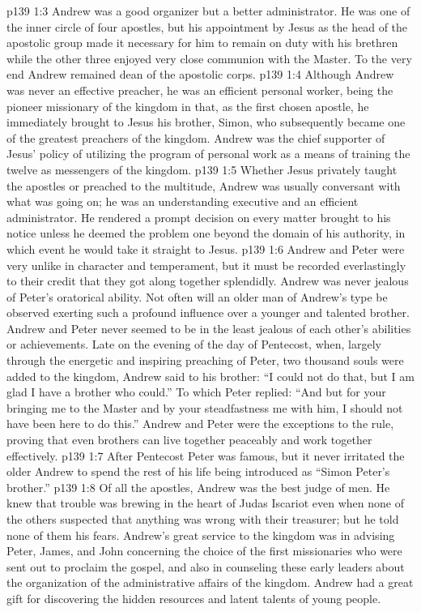 \pc \vs p139 1:3 Andrew was a good organizer but a better administrator. He was one of the inner circle of four apostles, but his appointment by Jesus as the head of the apostolic group made it necessary for him to remain on duty with his brethren while the other three enjoyed very close communion with the Master. To the very end Andrew remained dean of the apostolic corps.
\vs p139 1:4 Although Andrew was never an effective preacher, he was an efficient personal worker, being the pioneer missionary of the kingdom in that, as the first chosen apostle, he immediately brought to Jesus his brother, Simon, who subsequently became one of the greatest preachers of the kingdom. Andrew was the chief supporter of Jesus’ policy of utilizing the program of personal work as a means of training the twelve as messengers of the kingdom.
\vs p139 1:5 Whether Jesus privately taught the apostles or preached to the multitude, Andrew was usually conversant with what was going on; he was an understanding executive and an efficient administrator. He rendered a prompt decision on every matter brought to his notice unless he deemed the problem one beyond the domain of his authority, in which event he would take it straight to Jesus.
\pc \vs p139 1:6 Andrew and Peter were very unlike in character and temperament, but it must be recorded everlastingly to their credit that they got along together splendidly. Andrew was never jealous of Peter’s oratorical ability. Not often will an older man of Andrew’s type be observed exerting such a profound influence over a younger and talented brother. Andrew and Peter never seemed to be in the least jealous of each other’s abilities or achievements. Late on the evening of the day of Pentecost, when, largely through the energetic and inspiring preaching of Peter, two thousand souls were added to the kingdom, Andrew said to his brother: “I could not do that, but I am glad I have a brother who could.” To which Peter replied: “And but for your bringing me to the Master and by your steadfastness  me with him, I should not have been here to do this.” Andrew and Peter were the exceptions to the rule, proving that even brothers can live together peaceably and work together effectively.
\vs p139 1:7 After Pentecost Peter was famous, but it never irritated the older Andrew to spend the rest of his life being introduced as “Simon Peter’s brother.”
\pc \vs p139 1:8 Of all the apostles, Andrew was the best judge of men. He knew that trouble was brewing in the heart of Judas Iscariot even when none of the others suspected that anything was wrong with their treasurer; but he told none of them his fears. Andrew’s great service to the kingdom was in advising Peter, James, and John concerning the choice of the first missionaries who were sent out to proclaim the gospel, and also in counseling these early leaders about the organization of the administrative affairs of the kingdom. Andrew had a great gift for discovering the hidden resources and latent talents of young people.\plusone
